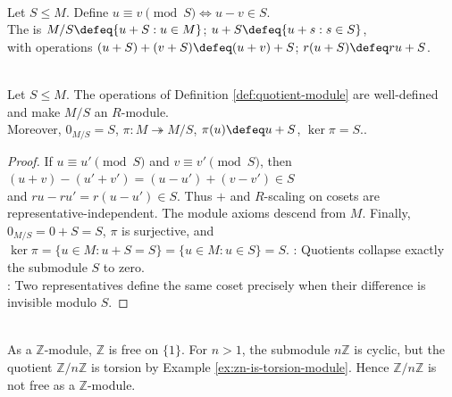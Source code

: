 \begin{definition} \label{def:quotient-module} \\
Let $S\leq M$. Define $u\equiv v\pmod S \Longleftrightarrow u-v\in S$.\\
The  is $M/S\defeq\{u+S:u\in M\}$; $u+S\defeq\{u+s:s\in S\}$,\\
with operations $(u+S)+(v+S)\defeq(u+v)+S$; $r(u+S)\defeq ru+S$.
\end{definition}

\begin{proposition} \label{prop:quotient-module-well-defined} \\
Let $S\leq M$. The operations of Definition \ref{def:quotient-module} are well-defined and make $M/S$ an $R$-module.\\
Moreover, $0_{M/S}=S$, $\pi:M\twoheadrightarrow M/S$, $\pi(u)\defeq u+S$, $\ker\pi=S.
$.
\begin{proof}
If $u\equiv u'\pmod S$ and $v\equiv v'\pmod S$, then $(u+v)-(u'+v')=(u-u')+(v-v')\in S$\\
and $ru-ru'=r(u-u')\in S$. Thus $+$ and $R$-scaling on cosets are representative-independent. The module axioms descend from $M$. Finally, $0_{M/S}=0+S=S$, $\pi$ is surjective, and $\ker\pi=\{u\in M:u+S=S\}=\{u\in M:u\in S\}=S$.
: Quotients collapse exactly the submodule $S$ to zero.\\
: Two representatives define the same coset precisely when their difference is invisible modulo $S$.
\end{proof}
\end{proposition}

\begin{example} \label{ex:quotient-free-module-need-not-free} \\
As a $\mathbb{Z}$-module, $\mathbb{Z}$ is free on $\{1\}$. For $n>1$, the submodule $n\mathbb{Z}$ is cyclic, but the quotient $\mathbb{Z}/n\mathbb{Z}$ is torsion by Example \ref{ex:zn-is-torsion-module}. Hence $\mathbb{Z}/n\mathbb{Z}$ is not free as a $\mathbb{Z}$-module.
\end{example}

